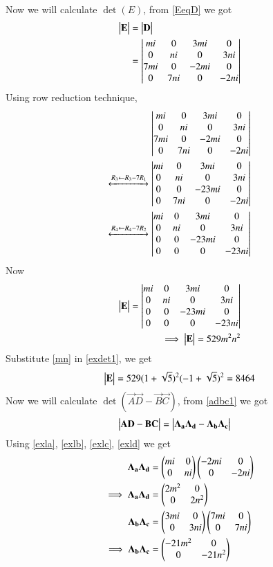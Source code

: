 \documentclass[journal,12pt,twocolumn]{IEEEtran}
\begin{document}
Now we will calculate $\det(E)$, from \eqref{EeqD} we got
\begin{align}
    \begin{vmatrix}\mathbf{E}\end{vmatrix}&=\begin{vmatrix}\mathbf{D}\end{vmatrix}\\
    &=\begin{vmatrix}mi&0&3mi&0\\0&ni&0&3ni\\7mi&0&-2mi&0\\0&7ni&0&-2ni\end{vmatrix}
\end{align}
Using row reduction technique,
\begin{align}
    \begin{vmatrix}mi&0&3mi&0\\0&ni&0&3ni\\7mi&0&-2mi&0\\0&7ni&0&-2ni\end{vmatrix}\\
    \xleftrightarrow[]{R_3\leftarrow R_3-7R_1}\begin{vmatrix}mi&0&3mi&0\\0&ni&0&3ni\\0&0&-23mi&0\\0&7ni&0&-2ni\end{vmatrix}\\
    \xleftrightarrow[]{R_4\leftarrow R_4-7R_2}\begin{vmatrix}mi&0&3mi&0\\0&ni&0&3ni\\0&0&-23mi&0\\0&0&0&-23ni\end{vmatrix}
\end{align}
Now
\begin{align}
    \begin{vmatrix}\mathbf{E}\end{vmatrix}=\begin{vmatrix}mi&0&3mi&0\\0&ni&0&3ni\\0&0&-23mi&0\\0&0&0&-23ni\end{vmatrix}\\
    \implies\begin{vmatrix}\mathbf{E}\end{vmatrix}=529m^2n^2\label{exdet1}
\end{align}
Substitute \eqref{mn} in \eqref{exdet1}, we get
\begin{align}
    \begin{vmatrix}\mathbf{E}\end{vmatrix}=529(1+\sqrt{5})^2(-1+\sqrt{5})^2=8464\label{exdetfin}
\end{align}
Now we will calculate $\det(\vec{A}\vec{D}-\vec{B}\vec{C})$, from \eqref{adbc1} we got
\begin{align}
    \begin{vmatrix}\mathbf{A}\mathbf{D}-\mathbf{B}\mathbf{C}\end{vmatrix}&=\begin{vmatrix}\mathbf{\Lambda_a}\mathbf{\Lambda_d}-\mathbf{\Lambda_b}\mathbf{\Lambda_c}\end{vmatrix}\label{exadbc1}
\end{align}
Using \eqref{exla}, \eqref{exlb}, \eqref{exlc}, \eqref{exld} we get
\begin{align}
    \mathbf{\Lambda_a}\mathbf{\Lambda_d}&=\begin{pmatrix}mi&0\\0&ni\end{pmatrix}\begin{pmatrix}-2mi&0\\0&-2ni\end{pmatrix}\\
    \implies\mathbf{\Lambda_a}\mathbf{\Lambda_d}&=\begin{pmatrix}2m^2&0\\0&2n^2\end{pmatrix}\label{exlald}\\
    \mathbf{\Lambda_b}\mathbf{\Lambda_c}&=\begin{pmatrix}3mi&0\\0&3ni\end{pmatrix}\begin{pmatrix}7mi&0\\0&7ni\end{pmatrix}\\
    \implies\mathbf{\Lambda_b}\mathbf{\Lambda_c}&=\begin{pmatrix}-21m^2&0\\0&-21n^2\end{pmatrix}\label{exlblc}
\end{align}
\end{document}
